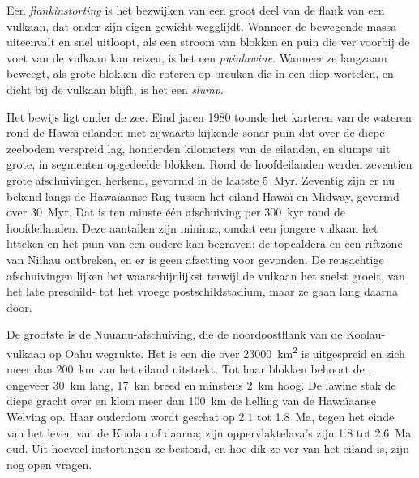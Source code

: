 \begin{definition}\label{def:b2:oceanic-islands:collapse}
Een \emph{flankinstorting} is het bezwijken van een groot deel van de flank van een
vulkaan, dat onder zijn eigen gewicht wegglijdt. Wanneer de bewegende massa uiteenvalt en snel
uitloopt, als een stroom van blokken en puin die ver voorbij de voet van de vulkaan kan reizen, is het een
\emph{puinlawine}. Wanneer ze langzaam beweegt, als grote blokken die roteren
op breuken die in een diep  wortelen, en dicht bij de vulkaan blijft, is het een \emph{slump}.
\end{definition}

Het bewijs ligt onder de zee. Eind jaren 1980 toonde het karteren van de wateren rond de
Hawaï-eilanden met zijwaarts kijkende sonar puin dat over de diepe zeebodem verspreid lag, honderden kilometers van
de eilanden, en slumps uit grote, in segmenten opgedeelde blokken. Rond de hoofdeilanden werden zeventien grote afschuivingen
herkend, gevormd in de laatste \qty{5}{Myr}. Zeventig zijn er nu bekend langs de
Hawaïaanse Rug tussen het eiland Hawaï en Midway, gevormd over \qty{30}{Myr}. Dat is ten
minste één afschuiving per \qty{300}{kyr} rond de hoofdeilanden. Deze aantallen zijn minima, omdat een
jongere vulkaan het litteken en het puin van een oudere kan begraven: de topcaldera en een riftzone
van Niihau ontbreken, en er is geen afzetting voor gevonden. De reusachtige afschuivingen lijken het waarschijnlijkst terwijl de
vulkaan het snelst groeit, van het late preschild- tot het vroege postschildstadium, maar ze gaan
lang daarna door.

De grootste is de Nuuanu-afschuiving, die de noordoostflank van de Koolau-vulkaan
op Oahu wegrukte. Het is een  die over \qty{23000}{km^2} is uitgespreid en zich meer dan
\qty{200}{km} van het eiland uitstrekt. Tot haar blokken behoort de , ongeveer \qty{30}{km} lang,
\qty{17}{km} breed en minstens \qty{2}{km} hoog. De lawine stak de diepe gracht over en klom
meer dan \qty{100}{km} de helling van de Hawaïaanse Welving op. Haar ouderdom wordt geschat op 2.1 tot
\qty{1.8}{Ma}, tegen het einde van het leven van de Koolau of daarna; zijn oppervlaktelava's zijn 1.8 tot
\qty{2.6}{Ma} oud. Uit hoeveel instortingen ze bestond, en hoe dik ze ver van het eiland is,
zijn nog open vragen.

